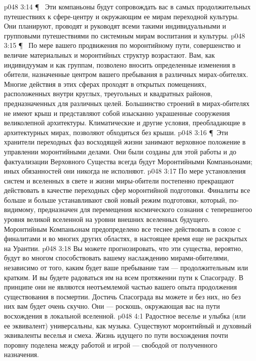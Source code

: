 \vs p048 3:14 \P\ \bibnobreakspace {} Эти компаньоны будут сопровождать вас в самых продолжительных путешествиях к сфере\hyp{}центру и окружающим ее мирам переходной культуры. Они планируют, проводят и руководят всеми такими индивидуальными и групповыми путешествиями по системным мирам воспитания и культуры.
\vs p048 3:15 \P\ \bibnobreakspace {} По мере вашего продвижения по моронтийному пути, совершенство и величие материальных и моронтийных структур возрастают. Вам, как индивидуумам и как группам, позволено вносить определенные изменения в обители, назначенные центром вашего пребывания в различных мирах\hyp{}обителях. Многие действия в этих сферах проходят в открытых помещениях, расположенных внутри круглых, треугольных и квадратных районов, предназначенных для различных целей. Большинство строений в мирах\hyp{}обителях не имеют крыш и представляют собой изысканно украшенные сооружения великолепной архитектуры. Климатические и другие условия, преобладающие в архитектурных мирах, позволяют обходиться без крыши.
\vs p048 3:16 \P\ Эти хранители переходных фаз восходящей жизни занимают верховное положение в управлении моронтийными делами. Они были созданы для этой работы и до фактуализации Верховного Существа всегда будут Моронтийными Компаньонами; иных обязанностей они никогда не исполняют.
\vs p048 3:17 По мере установления систем и вселенных в свете и жизни миры\hyp{}обители постепенно прекращают действовать в качестве переходных сфер моронтийной подготовки. Финалиты все больше и больше устанавливают свой новый режим подготовки, который, по\hyp{}видимому, предназначен для перемещения космического сознания с теперешнегоо уровня великой вселенной на уровни внешних вселенных будущего. Моронтийным Компаньонам предопределено все теснее действовать в союзе с финалитами и во многих других областях, в настоящее время еще не раскрытых на Урантии.
\vs p048 3:18 Вы можете прогнозировать, что эти существа, вероятно, будут во многом способствовать вашему наслаждению мирами\hyp{}обителями, независимо от того, каким будет ваше пребывание там --- продолжительным или кратким. И вы будете радоваться им на всем протяжении пути к Спасограду. В принципе они не являются неотъемлемой частью вашего опыта продолжения существования в посмертии. Достичь Спасограда вы можете и без них, но без них вам будет очень скучно. Они --- роскошь, окружающая вас на пути восхождения в локальной вселенной.
\vs p048 4:1 Радостное веселье и улыбка (или ее эквивалент) универсальны, как музыка. Существуют моронтийный и духовный эквиваленты веселья и смеха. Жизнь идущего по пути восхождения почти поровну поделена между работой и игрой --- свободой от полученного назначения.
